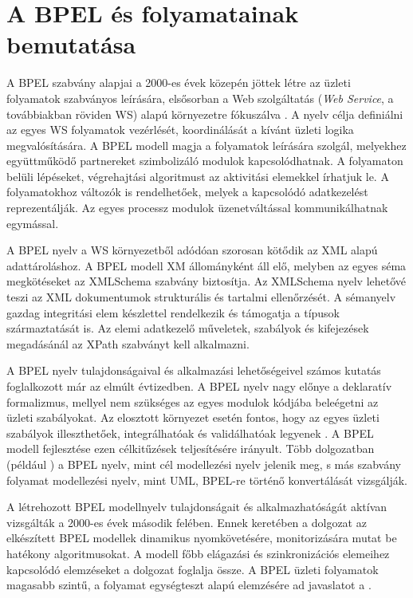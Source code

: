 
\chapter{A BPEL és folyamatainak bemutatása}

A BPEL szabvány alapjai a 2000-es évek közepén jöttek létre az üzleti folyamatok szabványos leírására, elsősorban a Web szolgáltatás (\textit{Web Service}, a továbbiakban röviden WS) alapú környezetre fókuszálva \cite{andrews2003business}. A nyelv célja definiálni az  egyes WS folyamatok vezérlését, koordinálását a kívánt üzleti logika megvalósítására.  A BPEL modell magja  a folyamatok leírására szolgál, melyekhez együttműködő partnereket szimbolizáló modulok kapcsolódhatnak. A folyamaton belüli lépéseket, végrehajtási algoritmust az aktivitási elemekkel írhatjuk le. A folyamatokhoz változók is rendelhetőek, melyek a kapcsolódó adatkezelést reprezentálják. Az egyes processz modulok üzenetváltással kommunikálhatnak egymással.   

A BPEL nyelv a WS környezetből adódóan szorosan kötődik az XML alapú adattároláshoz. A BPEL modell XM állományként áll elő, melyben az egyes séma megkötéseket az XMLSchema szabvány biztosítja. Az XMLSchema nyelv lehetővé teszi az XML dokumentumok strukturális és tartalmi ellenőrzését. A sémanyelv  gazdag integritási elem készlettel rendelkezik és támogatja a típusok származtatását is. Az elemi adatkezelő műveletek, szabályok és kifejezések megadásánál az XPath szabványt kell alkalmazni.  

A BPEL nyelv tulajdonságaival és alkalmazási lehetőségeivel számos kutatás foglalkozott már az elmúlt évtizedben. A BPEL nyelv nagy előnye a deklaratív formalizmus, mellyel nem szükséges  az egyes modulok kódjába beleégetni az üzleti szabályokat. Az elosztott környezet esetén fontos, hogy az egyes üzleti szabályok illeszthetőek, integrálhatóak és validálhatóak legyenek \cite{rosenberg2005business}. A BPEL modell fejlesztése ezen célkitűzések teljesítésére irányult. Több dolgozatban (például \cite{ouyang2006translating}) a BPEL nyelv, mint cél modellezési nyelv jelenik meg, s más szabvány folyamat modellezési nyelv, mint UML, BPEL-re történő konvertálását vizsgálják.   

A létrehozott BPEL modellnyelv tulajdonságait és alkalmazhatóságát  aktívan vizsgálták a 2000-es évek második felében. Ennek keretében a \cite{baresi2005towards} dolgozat az elkészített BPEL modellek dinamikus nyomkövetésére, monitorizására mutat be hatékony algoritmusokat. A modell főbb elágazási és szinkronizációs elemeihez kapcsolódó elemzéseket a \cite{ouyang2005wofbpel} dolgozat foglalja össze. A BPEL üzleti folyamatok magasabb szintű, a folyamat egységteszt alapú elemzésére ad javaslatot a \cite{mayer2006towards}.

